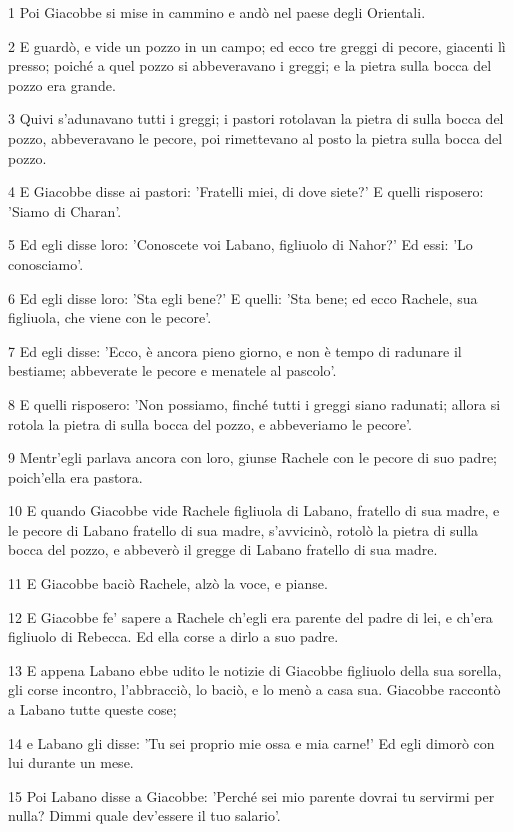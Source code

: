 \par 1 Poi Giacobbe si mise in cammino e andò nel paese degli Orientali.
\par 2 E guardò, e vide un pozzo in un campo; ed ecco tre greggi di pecore, giacenti lì presso; poiché a quel pozzo si abbeveravano i greggi; e la pietra sulla bocca del pozzo era grande.
\par 3 Quivi s'adunavano tutti i greggi; i pastori rotolavan la pietra di sulla bocca del pozzo, abbeveravano le pecore, poi rimettevano al posto la pietra sulla bocca del pozzo.
\par 4 E Giacobbe disse ai pastori: 'Fratelli miei, di dove siete?' E quelli risposero: 'Siamo di Charan'.
\par 5 Ed egli disse loro: 'Conoscete voi Labano, figliuolo di Nahor?' Ed essi: 'Lo conosciamo'.
\par 6 Ed egli disse loro: 'Sta egli bene?' E quelli: 'Sta bene; ed ecco Rachele, sua figliuola, che viene con le pecore'.
\par 7 Ed egli disse: 'Ecco, è ancora pieno giorno, e non è tempo di radunare il bestiame; abbeverate le pecore e menatele al pascolo'.
\par 8 E quelli risposero: 'Non possiamo, finché tutti i greggi siano radunati; allora si rotola la pietra di sulla bocca del pozzo, e abbeveriamo le pecore'.
\par 9 Mentr'egli parlava ancora con loro, giunse Rachele con le pecore di suo padre; poich'ella era pastora.
\par 10 E quando Giacobbe vide Rachele figliuola di Labano, fratello di sua madre, e le pecore di Labano fratello di sua madre, s'avvicinò, rotolò la pietra di sulla bocca del pozzo, e abbeverò il gregge di Labano fratello di sua madre.
\par 11 E Giacobbe baciò Rachele, alzò la voce, e pianse.
\par 12 E Giacobbe fe' sapere a Rachele ch'egli era parente del padre di lei, e ch'era figliuolo di Rebecca. Ed ella corse a dirlo a suo padre.
\par 13 E appena Labano ebbe udito le notizie di Giacobbe figliuolo della sua sorella, gli corse incontro, l'abbracciò, lo baciò, e lo menò a casa sua. Giacobbe raccontò a Labano tutte queste cose;
\par 14 e Labano gli disse: 'Tu sei proprio mie ossa e mia carne!' Ed egli dimorò con lui durante un mese.
\par 15 Poi Labano disse a Giacobbe: 'Perché sei mio parente dovrai tu servirmi per nulla? Dimmi quale dev'essere il tuo salario'.
